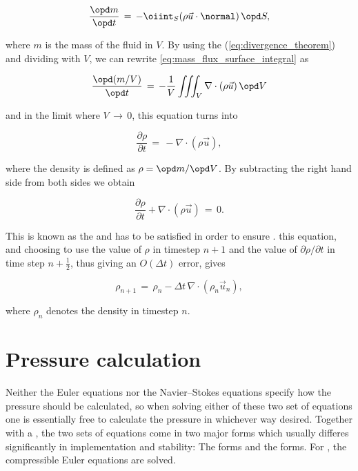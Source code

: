 \begin{equation} \label{eq:mass_flux_surface_integral}
\frac{\opd m}{\opd t} \,=\, -\oiint_S(\rho\vec{u}\cdot\normal)\,\opd S,
\end{equation}

where $m$ is the mass of the fluid in $V$. By using the  (\eqref{eq:divergence_theorem}) and dividing with $V$, we can rewrite \eqref{eq:mass_flux_surface_integral} as

\begin{equation} \label{eq:mass_flux_volume_integral}
\frac{\opd (m/V)}{\opd t} \,=\, -\frac{1}{V}\iiint_V\nabla\cdot(\rho\vec{u})\,\opd V
\end{equation}

and in the limit where $V \,\rightarrow\, 0$, this equation turns into

\begin{equation} \label{eq:density_partial_time_derivative}
\frac{\partial \rho}{\partial t} \,=\, -\nabla\cdot(\rho\vec{u}),
\end{equation}

where the density is defined as $\rho = \opd m/\opd V$. By subtracting the right hand side from both sides we obtain

\begin{equation} \label{eq:continuity_equation}
\frac{\partial \rho}{\partial t} + \nabla\cdot(\rho\vec{u}) \,=\, 0.
\end{equation}

This is known as the  and has to be satisfied in order to ensure .  this equation, and choosing to use the value of $\rho$ in timestep $n+1$ and the value of $\partial \rho/\partial t$ in time step $n+\frac{1}{2}$, thus giving an $O(\Delta t)$ error, gives

\begin{equation} \label{eq:continuity_equation_time_discretized}
\rho_{n+1} \,=\, \rho_{n} - \Delta t\,\nabla\cdot(\rho_{n}\vec{u}_{n}),
\end{equation}

where $\rho_n$ denotes the density in timestep $n$.

\section{Pressure calculation}

Neither the Euler equations nor the Navier--Stokes equations specify how the pressure should be calculated, so when solving either of these two set of equations one is essentially free to calculate the pressure in whichever way desired. Together with a , the two sets of equations come in two major forms which usually differes significantly in implementation and stability: The \compressible forms and the \incompressible forms. For \thisprojectwork, the compressible Euler equations are solved.

